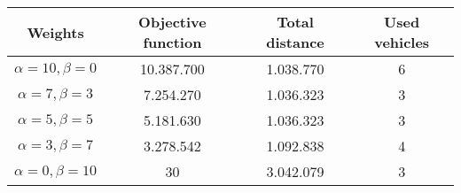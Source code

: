 {
\renewcommand{\arraystretch}{2}
\begin{longtable}[h]{| c | c | c | c |}
    \hline
    \textbf{Weights} & \textbf{Objective function} & \textbf{Total distance} & \textbf{Used vehicles} \\
    \hline
    \endhead
    $\alpha = 10, \beta = 0$ & 10.387.700 & 1.038.770 & 6 \\
    \hline
    $\alpha = 7, \beta = 3$  &  7.254.270 & 1.036.323 & 3 \\
    \hline
    $\alpha = 5, \beta = 5$  &  5.181.630 & 1.036.323 & 3 \\
    \hline
    $\alpha = 3, \beta = 7$  &  3.278.542 & 1.092.838 & 4 \\
    \hline
    $\alpha = 0, \beta = 10$ &         30 & 3.042.079 & 3 \\
    \hline
\end{longtable}
}